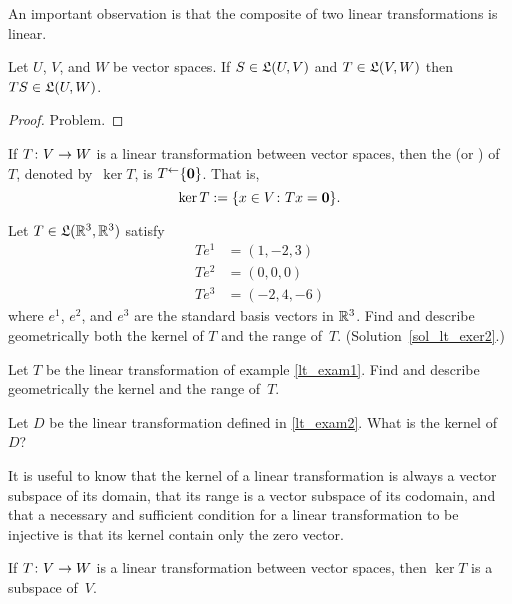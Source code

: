An important observation is that the composite of two linear transformations is linear.

\begin{prop}\label{prop_comp_lt} Let $U$, $V$, and $W$ be vector spaces. If $S \in \mathfrak{L}(U,V)$
and $T \in \mathfrak{L}(V,W)$ then $TS \in \mathfrak{L}(U,W)$.
\end{prop}

\begin{proof}  Problem. \ns  \end{proof}

\begin{defn}  If $T \colon  V \rightarrow W$ is a linear transformation between vector spaces, then the
 (or
) of~$T$, denoted
by~$\ker T$, is $T^\gets\{\mathbf{0}\}$. That is,
 \[ \ker T := \{x \in V \colon  Tx = \mathbf{0}\}. \]
\end{defn}

\begin{exer}\label{lt_exer2}  Let $T \in \mathfrak{L}(\mathbb{R}^3,\mathbb{R}^3)$
satisfy
 \begin{align*}
                        T e^1 &= (1,-2,3) \\
                        T e^2 &= (0,0,0)  \\
                        T e^3 &= (-2,4,-6)
 \end{align*}
where $e^1$, $e^2$, and $e^3$ are the standard basis vectors in $\mathbb{R}^3$.  Find and describe
geometrically both the kernel of $T$ and the range of~$T$. (Solution~\ref{sol_lt_exer2}.)
\end{exer}

\begin{prob} Let $T$ be the linear transformation of example \ref{lt_exam1}.  Find and describe
geometrically the kernel and the range of~$T$.
\end{prob}

\begin{prob} Let $D$ be the linear transformation defined in \ref{lt_exam2}. What is the kernel
of~$D$?
\end{prob}

It is useful to know that the kernel of a linear transformation is always a vector subspace of
its domain, that its range is a vector subspace of its codomain, and that a necessary and
sufficient condition for a linear transformation to be injective is that its kernel contain
only the zero vector.

\begin{prop}\label{prop_ker_vsubsp} If $T \colon  V \rightarrow W$ is a linear transformation between vector
spaces, then $\ker T$ is a subspace of~$V$.
\end{prop}

